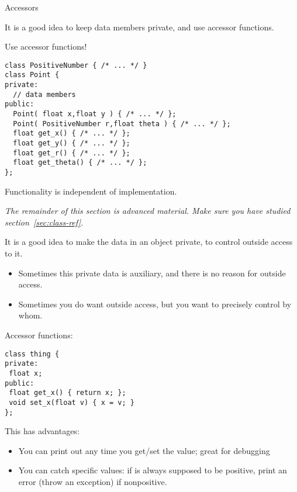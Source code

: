  {Accessors}

It is a good idea to keep data members private, and use accessor
functions.

\begin{block}{Use accessor functions!}
  \label{sl:repr-independent}
\begin{verbatim}
class PositiveNumber { /* ... */ }
class Point {
private:
  // data members
public:
  Point( float x,float y ) { /* ... */ };
  Point( PositiveNumber r,float theta ) { /* ... */ };
  float get_x() { /* ... */ };
  float get_y() { /* ... */ };
  float get_r() { /* ... */ };
  float get_theta() { /* ... */ };
};
\end{verbatim}
  Functionality is independent of implementation.
\end{block}

\begin{comment}
  \begin{exercise}
    \label{ex:geom:twoconstruct}
    Write a \n{Point} class that has two constructors:
\begin{verbatim}
class Point {
private:
  // data members
public:
  Point( float x,float y ) { /* ... */ };
  Point( float r,float theta ) { /* ... */ };
  float get_x() { /* ... */ };
  float get_y() { /* ... */ };
  float get_r() { /* ... */ };
  float get_theta() { /* ... */ };
};
\end{verbatim}
Use $r,\theta$ for the private variables, do not store $x,y$.
  \end{exercise}
\end{comment}

\emph{The remainder of this section is advanced material. Make sure
  you have studied section~\ref{sec:class-ref}.}

It is a good idea to make the data in an object private,
to control outside access to it.
\begin{itemize}
\item Sometimes this private data is auxiliary, and there is no reason
  for outside access.
\item Sometimes you do want outside access, but you want to precisely
  control by whom.
\end{itemize}

Accessor functions:
\begin{verbatim}
class thing {
private:
 float x;
public:
 float get_x() { return x; };
 void set_x(float v) { x = v; }
};
\end{verbatim}
This has advantages:
\begin{itemize}
\item You can print out any time you get/set the value; great for
  debugging
\item You can catch specific values: if  is always supposed to be
  positive, print an error (throw an exception) if nonpositive.
\end{itemize}

